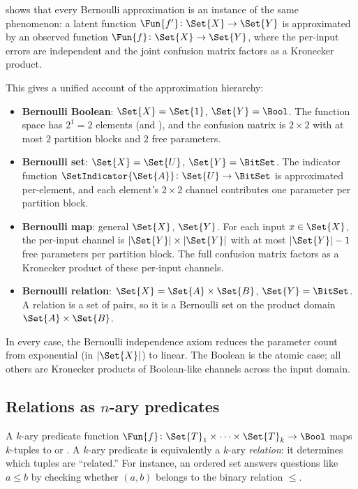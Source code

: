 \documentclass[ ../main.tex]{subfiles}
\begin{document}
\begin{remark}
\label{rem:function_space}
 shows that every Bernoulli approximation is an instance of the same phenomenon: a latent function $\Fun{f'} \colon \Set{X} \to \Set{Y}$ is approximated by an observed function $\Fun{f} \colon \Set{X} \to \Set{Y}$, where the per-input errors are independent and the joint confusion matrix factors as a Kronecker product.

This gives a unified account of the approximation hierarchy:
\begin{itemize}
\item \textbf{Bernoulli Boolean}: $\Set{X} = \Set{1}$, $\Set{Y} = \Bool$.
    The function space has $2^1 = 2$ elements (\True and \False), and the confusion matrix is $2 \times 2$ with at most $2$ partition blocks and $2$ free parameters.
\item \textbf{Bernoulli set}: $\Set{X} = \Set{U}$, $\Set{Y} = \BitSet$.
    The indicator function $\SetIndicator{\Set{A}} \colon \Set{U} \to \BitSet$ is approximated per-element, and each element's $2 \times 2$ channel contributes one parameter per partition block.
\item \textbf{Bernoulli map}: general $\Set{X}$, $\Set{Y}$.
    For each input $x \in \Set{X}$, the per-input channel is $|\Set{Y}| \times |\Set{Y}|$ with at most $|\Set{Y}| - 1$ free parameters per partition block.
    The full confusion matrix factors as a Kronecker product of these per-input channels.
\item \textbf{Bernoulli relation}: $\Set{X} = \Set{A} \times \Set{B}$, $\Set{Y} = \BitSet$.
    A relation is a set of pairs, so it is a Bernoulli set on the product domain $\Set{A} \times \Set{B}$.
\end{itemize}
In every case, the Bernoulli independence axiom reduces the parameter count from exponential (in $|\Set{X}|$) to linear.
The Boolean is the atomic case; all others are Kronecker products of Boolean-like channels across the input domain.
\end{remark}

\subsection{Relations as $n$-ary predicates}
\label{sec:nary}

A $k$-ary predicate function $\Fun{f} \colon \Set{T}_1 \times \cdots \times \Set{T}_k \to \Bool$ maps $k$-tuples to \True or \False.
A $k$-ary predicate is equivalently a $k$-ary \emph{relation}: it determines which tuples are ``related.''
For instance, an ordered set answers questions like $a \leq b$ by checking whether $(a,b)$ belongs to the binary relation ${\leq}$.
\end{document}
